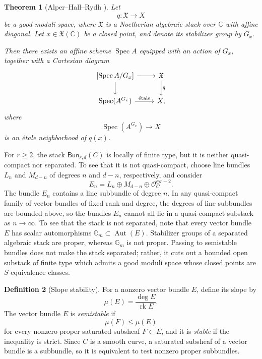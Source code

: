 \documentclass{amsart}
\newtheorem{thm}{Theorem}[section]
\theoremstyle{definition}
\newtheorem{defn}[thm]{Definition}
\theoremstyle{remark}
\theoremstyle{plain}
\theoremstyle{definition}
\theoremstyle{remark}
\newcommand{\G}{\mathbb{G}}
\newcommand{\C}{\mathbb{C}}
\newcommand{\mc}[1]{\mathcal{#1}}
\newcommand{\mf}[1]{\mathfrak{#1}}
\newcommand{\on}[1]{\operatorname{#1}}
\newcommand{\ms}[1]{\mathsf{#1}}
\newcommand{\1}{\mathbf{1}}
\newcommand{\2}{\mathbf{2}}
\newcommand{\3}{\mathbf{3}}
\begin{document}
\begin{thm}[Alper--Hall--Rydh {\cite{AHR2020}}]
    Let
    \[
        q\colon \mf{X}\longrightarrow X
    \]
    be a good moduli space, where \(\mf{X}\) is a Noetherian
    algebraic stack over \(\C\) with affine diagonal.
    Let \(x\in\mf{X}(\C)\) be a closed point, and denote its
    stabilizer group by \(G_x\).

    Then there exists an affine scheme \(\on{Spec}A\) equipped
    with an action of \(G_x\), together with a Cartesian diagram
    \[
        \begin{tikzcd}
            {[\on{Spec}A/G_x]}
                \arrow[r]
                \arrow[d]
            & \mf{X}
                \arrow[d, "q"]
            \\
            \on{Spec}(A^{G_x})
                \arrow[r, "\mathrm{\acute{e}tale}"]
            & X,
        \end{tikzcd}
    \]
    where
    \[
        \on{Spec}(A^{G_x})\longrightarrow X
    \]
    is an \'etale neighborhood of \(q(x)\).
\end{thm}

For \(r\geq 2\), the stack \(\ms{Bun}_{r,d}(C)\) is locally of finite type, but it is neither quasi-compact nor separated. To see that it is not quasi-compact, choose line bundles \(L_n\) and \(M_{d-n}\) of degrees \(n\) and \(d-n\), respectively, and consider
\[
    E_n=L_n\oplus M_{d-n}\oplus\mc{O}_C^{\oplus r-2}.
\]
The bundle \(E_n\) contains a line subbundle of degree \(n\). In any quasi-compact family of vector bundles of fixed rank and degree, the degrees of line subbundles are bounded above, so the bundles \(E_n\) cannot all lie in a quasi-compact substack as \(n\to\infty\). To see that the stack is not separated, note that every vector bundle \(E\) has scalar automorphisms \(\G_m\subset\on{Aut}(E)\). Stabilizer groups of a separated algebraic stack are proper, whereas \(\G_m\) is not proper. Passing to semistable bundles does not make the stack separated; rather, it cuts out a bounded open substack of finite type which admits a good moduli space whose closed points are \(S\)-equivalence classes.

\begin{defn}[Slope stability]
    For a nonzero vector bundle \(E\), define its slope by
    \[ \mu(E)=\frac{\deg E}{\on{rk}E}. \]
    The vector bundle \(E\) is \textit{semistable} if
    \[ \mu(F)\leq\mu(E) \]
    for every nonzero proper saturated subsheaf \(F\subset E\), and it is \textit{stable} if the inequality is strict. Since \(C\) is a smooth curve, a saturated subsheaf of a vector bundle is a subbundle, so it is equivalent to test nonzero proper subbundles.
\end{defn}
\end{document}
